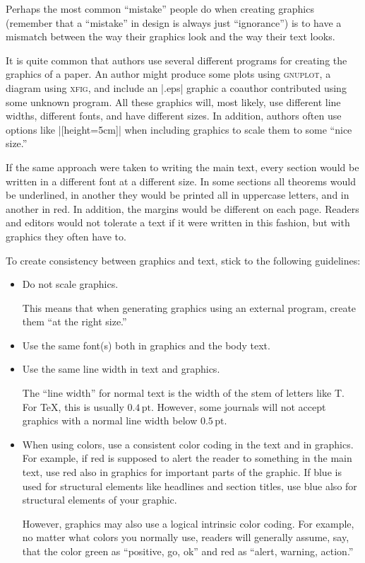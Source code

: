Perhaps the most common ``mistake'' people do when creating graphics
(remember that a ``mistake'' in design is always just ``ignorance'')
is to have a mismatch between the way their graphics look and the way
their text looks.

It is quite common that authors use several different programs for
creating the graphics of a paper. An author might produce some plots
using \textsc{gnuplot}, a diagram using \textsc{xfig}, and include an
|.eps| graphic a coauthor contributed using some unknown program. All
these graphics will, most likely, use different line widths, different
fonts, and have different sizes. In addition, authors often use
options like |[height=5cm]| when including graphics to scale them to
some ``nice size.''

If the same approach were taken to writing the main text, every
section would be written in a different font at a different size. In
some sections all theorems would be underlined, in another they would
be printed all in uppercase letters, and in another in red. In
addition, the margins would be different on each page.
Readers and editors would not tolerate a text if it were written in
this fashion, but with graphics they often have to.

To create consistency between graphics and text, stick to the
following guidelines:
\begin{itemize}
\item
  Do not scale graphics.

  This means that when generating graphics using an external program,
  create them ``at the right size.''
\item
  Use the same font(s) both in graphics and the body text.
\item
  Use the same line width in text and graphics.

  The  ``line width'' for normal text is the width of the stem of
  letters like T{}. For \TeX, this is usually
  $0.4\,\mathrm{pt}$. However, some journals will not accept graphics
  with a normal line width below $0.5\,\mathrm{pt}$.
\item
  When using colors, use a consistent color coding in the text and in
  graphics. For example, if red is supposed to alert the reader to
  something in the main text, use red also in graphics for important
  parts of the graphic. If blue is used for structural elements like
  headlines and section titles, use blue also for structural elements
  of your graphic.

  However, graphics may also use a logical intrinsic color
  coding. For example, no matter what colors you normally use, readers
  will generally assume, say, that the color green as ``positive, go,
  ok'' and red as ``alert, warning, action.''
\end{itemize}

